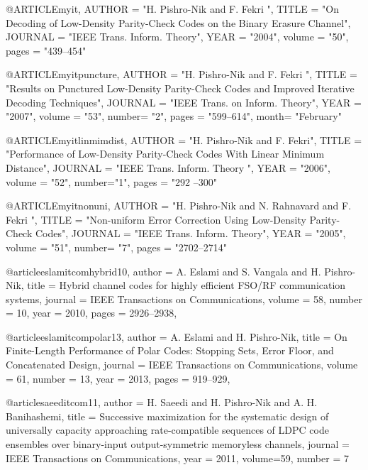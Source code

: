 {{{{{{{{@ARTICLE{myit,
  AUTHOR =       "H. Pishro-Nik and F. Fekri  ",
  TITLE =        "On Decoding of Low-Density Parity-Check Codes on the Binary Erasure Channel",
  JOURNAL =      "IEEE Trans. Inform. Theory",
  YEAR =         "2004",
  volume =       "50",
  pages =        "439--454"
  }




@ARTICLE{myitpuncture,
  AUTHOR =       "H. Pishro-Nik and F. Fekri  ",
  TITLE =        "Results on Punctured Low-Density Parity-Check Codes and Improved Iterative Decoding Techniques",
  JOURNAL =      "IEEE Trans. on Inform. Theory",
  YEAR =         "2007",
  volume =       "53",
  number=        "2",
  pages =        "599--614",
  month= "February"
  }




@ARTICLE{myitlinmimdist,
  AUTHOR =       "H. Pishro-Nik and F. Fekri",
  TITLE =        "Performance of Low-Density Parity-Check Codes With Linear Minimum Distance",
  JOURNAL =         "IEEE Trans. Inform. Theory ",
  YEAR =         "2006",
  volume =       "52",
  number="1",
  pages =        "292 --300"
  }






@ARTICLE{myitnonuni,
  AUTHOR =       "H. Pishro-Nik and N. Rahnavard and F. Fekri  ",
  TITLE =        "Non-uniform Error Correction Using Low-Density Parity-Check Codes",
  JOURNAL =      "IEEE Trans. Inform. Theory",
  YEAR =         "2005",
  volume =       "51",
  number=  "7",
  pages =        "2702--2714"
 }





@article{eslamitcomhybrid10,
 author = {A. Eslami and S. Vangala and H. Pishro-Nik},
 title = {Hybrid channel codes for highly efficient FSO/RF communication systems},
 journal = {IEEE Transactions on Communications},
 volume = {58},
 number = {10},
 year = {2010},
 pages = {2926--2938},
 }


@article{eslamitcompolar13,
 author = {A. Eslami and H. Pishro-Nik},
 title = {On Finite-Length Performance of Polar Codes: Stopping Sets, Error Floor, and Concatenated Design},
 journal = {IEEE Transactions on Communications},
 volume = {61},
 number = {13},
 year = {2013},
 pages = {919--929},
 }



 @article{saeeditcom11,
 author = {H. Saeedi and H. Pishro-Nik and  A. H. Banihashemi},
 title = {Successive maximization for the systematic design of universally capacity approaching rate-compatible
 sequences of LDPC code ensembles over binary-input output-symmetric memoryless channels},
 journal = {IEEE Transactions on Communications},
 year = {2011},
 volume={59},
 number = {7}
 }


}}}}}}}}
